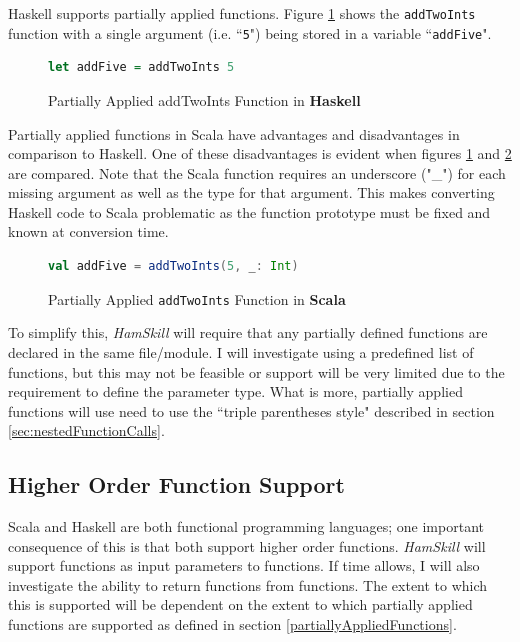 \documentclass{report}
\begin{document}
Haskell supports partially applied functions.  Figure \ref{fig:addFiveHaskell} shows the {\tt addTwoInts} function with a single argument (i.e. ``{\tt 5}") being stored in a variable ``{\tt addFive}".  

\begin{figure}[H]
\begin{mdframed}
\begin{lstlisting}[language=Haskell]
let addFive = addTwoInts 5
\end{lstlisting}
\end{mdframed}
\caption{Partially Applied addTwoInts Function in \textbf{Haskell}}\label{fig:addFiveHaskell}
\end{figure}

Partially applied functions in Scala have advantages and disadvantages in comparison to Haskell.  One of these disadvantages is evident when figures \ref{fig:addFiveHaskell} and \ref{fig:addFiveScala} are compared.  Note that the Scala function requires an underscore ("\_") for each missing argument as well as the type for that argument.  This makes converting Haskell code to Scala problematic as the function prototype must be fixed and known at conversion time.  

\begin{figure}[H]
\begin{mdframed}
\begin{lstlisting}[language=Scala]
val addFive = addTwoInts(5, _: Int)
\end{lstlisting}
\end{mdframed}
\caption{Partially Applied {\tt addTwoInts} Function in \textbf{Scala}}\label{fig:addFiveScala}
\end{figure}

To simplify this, \emph{HamSkill} will require that any partially defined functions are declared in the same file/module.  I will investigate using a predefined list of functions, but this may not be feasible or support will be very limited due to the requirement to define the parameter type.  What is more, partially applied functions will use need to use the ``triple parentheses style" described in section \ref{sec:nestedFunctionCalls}.

\subsection{Higher Order Function Support}\label{sec:higherOrderFunctions}

Scala and Haskell are both functional programming languages; one important consequence of this is that both support higher order functions.  \emph{HamSkill} will support functions as input parameters to functions.  If time allows, I will also investigate the ability to return functions from functions.  The extent to which this is supported will be dependent on the extent to which partially applied functions are supported as defined in section \ref{partiallyAppliedFunctions}.
\end{document}
